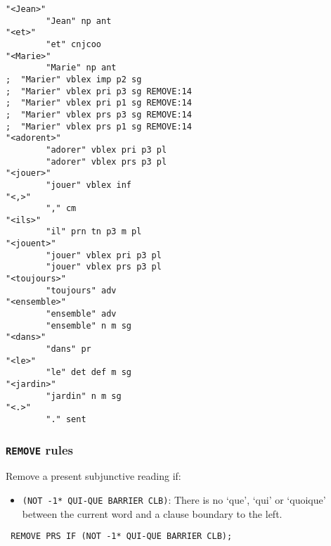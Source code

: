 \documentclass[10pt,xetex]{beamer} %
\begin{document}
\begin{frame}[fragile]

\begin{multicols}{2}
\begin{verbatim}
"<Jean>"
        "Jean" np ant
"<et>"
        "et" cnjcoo
"<Marie>"
        "Marie" np ant
;  "Marier" vblex imp p2 sg
;  "Marier" vblex pri p3 sg REMOVE:14
;  "Marier" vblex pri p1 sg REMOVE:14
;  "Marier" vblex prs p3 sg REMOVE:14
;  "Marier" vblex prs p1 sg REMOVE:14
"<adorent>"
        "adorer" vblex pri p3 pl
        "adorer" vblex prs p3 pl
"<jouer>"
        "jouer" vblex inf
"<,>"
        "," cm
"<ils>"
        "il" prn tn p3 m pl
"<jouent>"
        "jouer" vblex pri p3 pl
        "jouer" vblex prs p3 pl
"<toujours>"
        "toujours" adv
"<ensemble>"
        "ensemble" adv
        "ensemble" n m sg
"<dans>"
        "dans" pr
"<le>"
        "le" det def m sg
"<jardin>"
        "jardin" n m sg
"<.>"
        "." sent

\end{verbatim}
\end{multicols}

\end{frame}

\begin{frame}
  \frametitle{\texttt{REMOVE} rules}

Remove a present subjunctive reading if:

\begin{itemize}
   \item \texttt{(NOT -1* QUI-QUE BARRIER CLB)}: There is no `que', `qui' or `quoique' between the
      current word and a clause boundary to the left.
\end{itemize}

\pause
\begin{center}
\texttt{
REMOVE PRS IF (NOT -1* QUI-QUE BARRIER CLB);
}
\end{center}

\end{frame}
\end{document}
